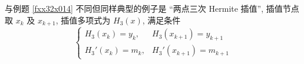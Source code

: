 
与例题 \ref{fxx32x014} 不同但同样典型的例子是 “两点三次 Hermite 插值”, 插值节点取 $x_k$ 及 $x_{k+1}$, 插值多项式为 $H_3(x)$, 满足条件
$$\begin{cases}
        H_3(x_k)=y_k,  & H_3(x_{k+1})=y_{k+1}  \\
        H_3'(x_k)=m_k, & H_3'(x_{k+1})=m_{k+1}
    \end{cases}$$

